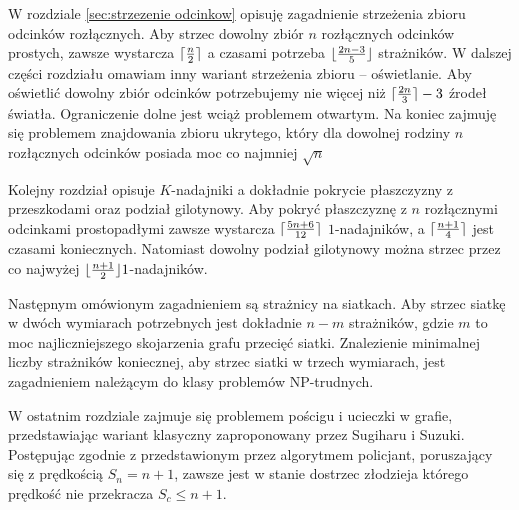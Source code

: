 \documentclass[brudnopis]{xmgr}
\DeclarePairedDelimiter\ceil{\lceil}{\rceil}
\DeclarePairedDelimiter\floor{\lfloor}{\rfloor}
\theoremstyle{definition}
\begin{document}
W rozdziale \ref{sec:strzezenie odcinkow} opisuję zagadnienie strzeżenia zbioru odcinków rozłącznych.
Aby strzec dowolny zbiór $n$ rozłącznych odcinków prostych, zawsze wystarcza $\ceil{\frac{n}{2}}$ a czasami potrzeba $\floor{\frac{2n-3}{5}}$ strażników. W dalszej części rozdziału omawiam inny wariant strzeżenia zbioru -- oświetlanie. Aby oświetlić dowolny zbiór odcinków potrzebujemy nie więcej niż $\ceil{\frac{2n}{3}} - 3$ źrodeł światła. Ograniczenie dolne jest wciąż problemem otwartym. Na koniec zajmuję się problemem znajdowania zbioru ukrytego, który dla dowolnej rodziny $n$ rozłącznych odcinków posiada moc co najmniej $\sqrt{n}$

Kolejny rozdział opisuje $K$-nadajniki a dokładnie pokrycie płaszczyzny z przeszkodami oraz podział gilotynowy. Aby pokryć płaszczyznę z $n$ rozłącznymi odcinkami prostopadłymi zawsze wystarcza $\ceil{\frac{5n+6}{12}}$ $1$-nadajników, a $\ceil{\frac{n+1}{4}}$ jest czasami koniecznych. Natomiast dowolny podział gilotynowy można strzec przez co najwyżej $\floor{\frac{n+1}{2}} 1$-nadajników.

Następnym omówionym zagadnieniem są strażnicy na siatkach. Aby strzec siatkę w dwóch wymiarach potrzebnych jest dokładnie $n - m$ strażników, gdzie $m$ to moc najliczniejszego skojarzenia grafu przecięć siatki. Znalezienie minimalnej liczby strażników koniecznej, aby strzec siatki w trzech wymiarach, jest zagadnieniem należącym do klasy problemów NP-trudnych.

W ostatnim rozdziale zajmuje się problemem pościgu i ucieczki w grafie, przedstawiając wariant klasyczny zaproponowany przez Sugiharu i Suzuki. Postępując zgodnie z przedstawionym przez  algorytmem policjant, poruszający się z prędkością $S_n = n + 1$, zawsze jest w stanie dostrzec złodzieja którego prędkość nie przekracza $S_c \leq n + 1$. 

\appendix
\end{document}
